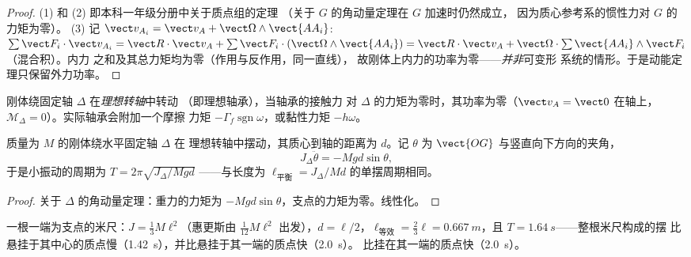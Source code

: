 \begin{proof}
(1) 和 (2) 即本科一年级分册中关于质点组的定理
（关于 $G$ 的角动量定理在 $G$ 加速时仍然成立，
因为质心参考系的惯性力对 $G$ 的力矩为零）。
(3) 记 $\vect v_{A_i} = \vect v_A + \vect\Omega
\wedge\vect{AA_i}$: $\sum\vect F_i\cdot\vect v_{A_i} = \vect R\cdot\vect v_A
+ \sum\vect F_i\cdot(\vect\Omega\wedge\vect{AA_i}) = \vect R\cdot\vect v_A +
\vect\Omega\cdot\sum\vect{AA_i}\wedge\vect F_i$（混合积）。内力
之和及其总力矩均为零（作用与反作用，同一直线），
故刚体上内力的功率为零——\emph{并非}可变形
系统的情形。于是动能定理只保留外力功率。
\end{proof}

\begin{definition}[理想转轴]\label{def:b2:rigid-body-mechanics:pivot}
刚体绕固定轴 $\Delta$ 在\emph{理想转轴}中转动
（即理想轴承），当轴承的接触力
对 $\Delta$ 的力矩为零时，其功率为零（$\vect v_A = \vect 0$
在轴上，$\mathcal M_\Delta = 0$）。实际轴承会附加一个摩擦
力矩 $-\Gamma_f\operatorname{sgn}\omega$，或黏性力矩 $-h\omega$。
\end{definition}

\begin{proposition}[物理摆]\label{prop:b2:rigid-body-mechanics:pendulum}
质量为 $M$ 的刚体绕水平固定轴 $\Delta$ 在
理想转轴中摆动，其质心到轴的距离为 $d$。记
$\theta$ 为 $\vect{OG}$ 与竖直向下方向的夹角，
\[
J_\Delta\ddot\theta = -Mgd\sin\theta ,
\]
于是小振动的周期为 $T = 2\pi\sqrt{J_\Delta/Mgd}$
——与长度为 $\ell_{\text{平衡}} = J_\Delta/Md$ 的单摆周期相同。
\end{proposition}

\begin{proof}
关于 $\Delta$ 的角动量定理：重力的力矩为
$-Mgd\sin\theta$，支点的力矩为零。线性化。
\end{proof}

\begin{example}[米尺]\label{ex:b2:rigid-body-mechanics:rule}
一根一端为支点的米尺：$J = \tfrac13M\ell^2$（惠更斯由
$\tfrac1{12}M\ell^2$ 出发），$d = \ell/2$，$\ell_{\text{等效}} = \tfrac23\ell =
\qty{0.667}{m}$，且 $T = \qty{1.64}{s}$——整根米尺构成的摆
比悬挂于其中心的质点慢（\qty{1.42}{s}），并比悬挂于其一端的质点快（\qty{2.0}{s}）。
比挂在其一端的质点快（\qty{2.0}{s}）。
\end{example}

